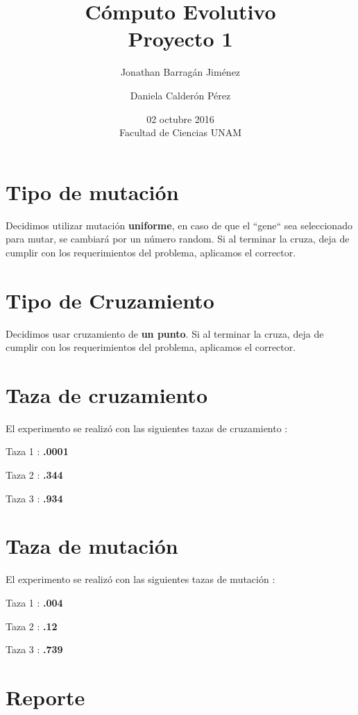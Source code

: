 \documentclass[letterpaper,11pt]{article}
\title{C\'omputo Evolutivo\\Proyecto 1}
\author{Jonathan Barrag\'an Jim\'enez \and Daniela Calder\'on P\'erez }
\date{02 octubre  2016\\ Facultad de Ciencias UNAM}
\begin{document}
 
 \maketitle
\section*{Tipo de mutaci\'on}
 Decidimos utilizar mutaci\'on \textbf{uniforme}, en caso de que el ``gene`` sea seleccionado para mutar, se cambiar\'a por un n\'umero random.
 \newline
 Si al terminar la cruza, deja de cumplir con los requerimientos del problema, aplicamos el corrector.
 
 \section*{Tipo de Cruzamiento}
  Decidimos usar cruzamiento de \textbf{un punto}.
  \newline
  Si al terminar la cruza, deja de cumplir con los requerimientos del problema, aplicamos el corrector.

\section*{Taza de cruzamiento}
 El experimento se realiz\'o con las siguientes tazas de cruzamiento :
 \newline
 
 Taza 1 : \textbf{.0001}
 \newline
 
 Taza 2 : \textbf{.344}
 \newline
 
 Taza 3 : \textbf{.934}
 
 \section*{Taza de mutaci\'on}
 El experimento se realiz\'o con las siguientes tazas de mutaci\'on :
 \newline
 
 Taza 1 : \textbf{.004}
 \newline
 
 Taza 2 : \textbf{.12}
 \newline
 
 Taza 3 : \textbf{.739}
 
 \section*{Reporte}
 
\end{document}
